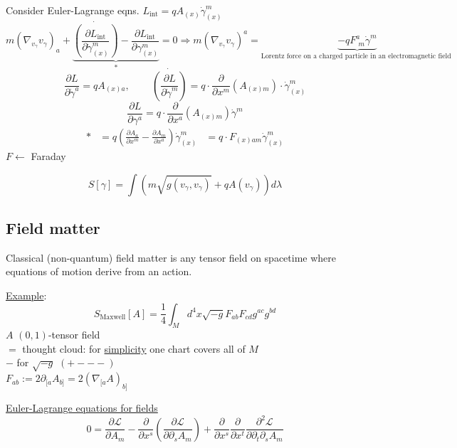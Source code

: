 	Consider Euler-Lagrange eqns. $L_{\text{int}} = q A_{(x)} \dot{\gamma}^m_{(x)}$
	\[
	m (\nabla_{v_{\gamma}} v_{\gamma})_a + \underbrace{ \dot{ \left( \frac{ \partial L_{\text{int}} }{ \partial \dot{\gamma}^m_{(x)} } \right) }- \frac{ \partial L_{\text{int}} }{ \partial \gamma^m_{(x)} } }_{*} = 0  \Longrightarrow \boxed{ m (\nabla_{v_{\gamma} } v_{\gamma})^a = \underbrace{ -q F^a_{ \, \, m } \dot{\gamma}^m }_{\text{Lorentz force on a charged particle in an electromagnetic field } } }
	\]
	\[
	\frac{ \partial L}{ \partial \dot{\gamma}^a} = qA_{(x)a}, \quad \quad \, \dot{ \left( \frac{ \partial L}{ \partial \dot{\gamma}^m} \right) } = q \cdot \frac{ \partial }{ \partial x^m} (A_{(x)m} ) \cdot \dot{\gamma}^m_{(x)}
	\]
	\[
	\frac{ \partial L}{ \partial \gamma^a} = q \cdot \frac{ \partial }{ \partial x^a} (A_{(x)m} ) \dot{\gamma}^m
	\]
	\[
	\begin{aligned}
	* & = q\left( \frac{ \partial A_a}{ \partial x^m} - \frac{ \partial A_m}{ \partial x^a} \right) \dot{\gamma}^m_{(x)}
	& = q \cdot F_{(x)am} \dot{\gamma}^m_{(x)}
	\end{aligned}
	\]
	$F \leftarrow $ Faraday
	
	\[
	S[\gamma] = \int(m\sqrt{g(v_{\gamma},v_{\gamma} ) } + q A(v_{\gamma}) ) d\lambda
	\]
	
	\subsection{Field matter}
	
	\begin{definition}
		Classical (non-quantum) field matter is any tensor field on spacetime where equations of motion derive from an action.
	\end{definition}
	
	\underline{Example}: 
	\[
	S_{\text{Maxwell}}[A] = \frac{1}{4}\int_M d^4x \sqrt{-g}F_{ab}F_{cd}g^{ac}g^{bd}
	\]
	$A$ $(0,1)$-tensor field \\
	$=$ thought cloud: for \underline{simplicity} one chart covers all of $M$ \\
	$-$ for $\sqrt{-g}$ $(+---)$ \\
	
	$F_{ab} := 2\partial_{[a}A_{b]} = 2(\nabla_{[a} A)_{b]}$
	
	\underline{Euler-Lagrange equations for fields}
	\[
	0 = \frac{ \partial \mathcal{L}}{ \partial A_m} - \frac{ \partial }{ \partial x^s} \left( \frac{ \partial \mathcal{L}}{ \partial \partial _s A_m } \right) + \frac{ \partial }{ \partial x^s} \frac{ \partial }{ \partial x^t} \frac{ \partial^2 \mathcal{L}}{ \partial \partial_t \partial_s A_m }
	\]
	
